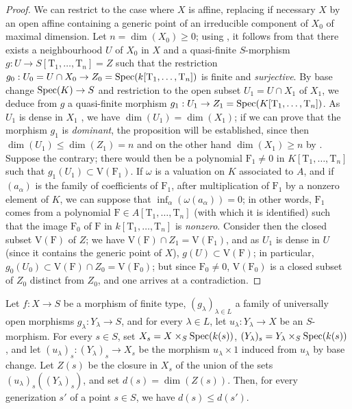 \begin{proof}
We can restrict to the case where $X$ is affine, replacing if necessary $X$ by an open affine containing a generic point of an irreducible component of $X_0$ of maximal dimension.
Let $n=\dim(X_0)\geq 0$; using , it follows from  that there exists a neighbourhood $U$ of $X_0$ in $X$ and a quasi-finite $S$-morphism $g:U\to S[\mathrm{T}_1,\ldots,\mathrm{T}_n]=Z$ such that the restriction $g_0:U_0=U\cap X_0\to Z_0=\operatorname{Spec}(k[\mathrm{T}_1,\ldots,\mathrm{T}_n])$ is finite and \emph{surjective}.
By base change $\operatorname{Spec}(K)\to S$ and restriction to the open subset $U_1=U\cap X_1$ of $X_1$, we deduce from $g$ a quasi-finite morphism $g_1:U_1\to Z_1=\operatorname{Spec}(K[\mathrm{T}_1,\ldots,\mathrm{T}_n])$.
As $U_1$ is dense in $X_1$ , we have $\dim(U_1)=\dim(X_1)$; if we can prove that the morphism $g_1$ is \emph{dominant}, the proposition will be established, since then $\dim(U_1)\leq\dim(Z_1)=n$ and on the other hand $\dim(X_1)\geq n$ by .
Suppose the contrary; there would then be a polynomial $\mathrm{F}_1\neq 0$ in $K[\mathrm{T}_1,\ldots,\mathrm{T}_n]$ such that $g_1(U_1)\subset\mathrm{V}(\mathrm{F}_1)$.
If $\omega$ is a valuation on $K$ associated to $A$, and if $(a_\alpha)$ is the family of coefficients of $\mathrm{F}_1$, after multiplication of $\mathrm{F}_1$ by a nonzero element of $K$, we can suppose that $\inf_\alpha(\omega(a_\alpha))=0$; in other words, $\mathrm{F}_1$ comes from a polynomial $\mathrm{F}\in A[\mathrm{T}_1,\ldots,\mathrm{T}_n]$ (with which it is identified) such that the image $\mathrm{F}_0$ of $\mathrm{F}$ in $k[\mathrm{T}_1,\ldots,\mathrm{T}_n]$ is \emph{nonzero}.
Consider then the closed subset $\mathrm{V}(\mathrm{F})$ of $Z$; we have $\mathrm{V}(\mathrm{F})\cap Z_1=\mathrm{V}(\mathrm{F}_1)$, and as $U_1$
is dense in $U$ (since it contains the generic point of $X$), $g(U)\subset\mathrm{V}(\mathrm{F})$; in particular, $g_0(U_0)\subset\mathrm{V}(\mathrm{F})\cap Z_0=\mathrm{V}(\mathrm{F}_0)$; but since $\mathrm{F}_0\neq 0$, $\mathrm{V}(\mathrm{F}_0)$ is a closed subset of $Z_0$ distinct from $Z_0$, and one arrives at a contradiction.
\end{proof}

\begin{proposition}[14.3.11]
\label{IV.14.3.11}
Let $f:X\to S$ be a morphism of finite type, $(g_\lambda)_{\lambda\in L}$ a family of universally open morphisms $g_\lambda:Y_\lambda\to S$, and for every $\lambda\in L$, let $u_\lambda:Y_\lambda\to X$ be an $S$-morphism.
For every $s\in S$, set $X_s=X\times_S\operatorname{Spec}(k(s))$, $(Y_\lambda)_s=Y_\lambda\times_S\operatorname{Spec}(k(s))$, and let $(u_\lambda)_s:(Y_\lambda)_s\to X_s$ be the morphism $u_\lambda\times 1$ induced from $u_\lambda$ by base change.
Let $Z(s)$ be the closure in $X_s$ of the union of the sets $(u_\lambda)_s((Y_\lambda)_s)$, and set $d(s)=\dim(Z(s))$.
Then, for every generization $s'$ of a point $s\in S$, we have $d(s)\leq d(s')$.
\end{proposition}

